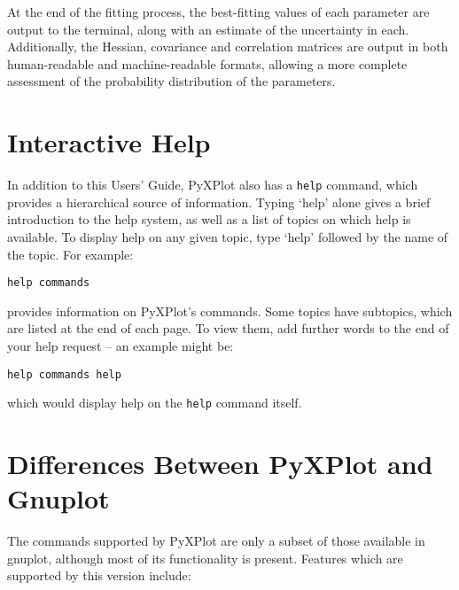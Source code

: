 \documentclass[a4paper,onecolumn,11pt]{book}
\begin{document}
At the end of the fitting process, the best-fitting values of each parameter
are output to the terminal, along with an estimate of the uncertainty in each.
Additionally, the Hessian, covariance and correlation matrices are output in
both human-readable and machine-readable formats, allowing a more complete
assessment of the probability distribution of the parameters.

\section{Interactive Help}

In addition to this Users' Guide, PyXPlot also has a \texttt{help} command,
which provides a hierarchical source of information. Typing `help' alone gives a
brief introduction to the help system, as well as a list of topics on which
help is available. To display help on any given topic, type `help' followed by
the name of the topic. For example:

\begin{verbatim}
help commands
\end{verbatim}

\noindent provides information on PyXPlot's commands. Some topics have
subtopics, which are listed at the end of each page. To view them, add further
words to the end of your help request -- an example might be:

\begin{verbatim}
help commands help
\end{verbatim}

\noindent which would display help on the \texttt{help} command itself.

\section{Differences Between PyXPlot and Gnuplot}
\label{missing_features}

The commands supported by PyXPlot are only a subset of those available in
gnuplot, although most of its functionality is present. Features which are
supported by this version include:
\end{document}
